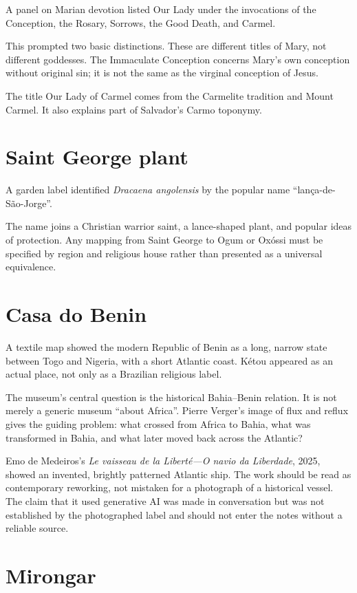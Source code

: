 A panel on Marian devotion listed Our Lady
under the invocations of the Conception,
the Rosary, Sorrows, the Good Death, and
Carmel.

This prompted two basic distinctions.
These are different titles of Mary, not
different goddesses.  The Immaculate
Conception concerns Mary's own conception
without original sin; it is not the same as
the virginal conception of Jesus.

The title Our Lady of Carmel comes from the
Carmelite tradition and Mount Carmel.  It
also explains part of Salvador's Carmo
toponymy.

\section{Saint George plant}

A garden label identified
\emph{Dracaena angolensis} by the popular
name ``lan\c{c}a-de-S\~ao-Jorge''.

The name joins a Christian warrior saint,
a lance-shaped plant, and popular ideas of
protection.  Any mapping from Saint George
to Ogum or Ox\'ossi must be specified by
region and religious house rather than
presented as a universal equivalence.

\section{Casa do Benin}

A textile map showed the modern Republic
of Benin as a long, narrow state between
Togo and Nigeria, with a short Atlantic
coast.  K\'etou appeared as an actual place,
not only as a Brazilian religious label.

The museum's central question is the
historical Bahia--Benin relation.  It is
not merely a generic museum ``about
Africa''.  Pierre Verger's image of flux
and reflux gives the guiding problem:
what crossed from Africa to Bahia, what was
transformed in Bahia, and what later moved
back across the Atlantic?

Emo de Medeiros's
\emph{Le vaisseau de la Libert\'e---O navio
da Liberdade}, 2025, showed an invented,
brightly patterned Atlantic ship.  The
work should be read as contemporary
reworking, not mistaken for a photograph
of a historical vessel.  The claim that it
used generative AI was made in conversation
but was not established by the photographed
label and should not enter the notes without
a reliable source.

\section{Mirongar}

